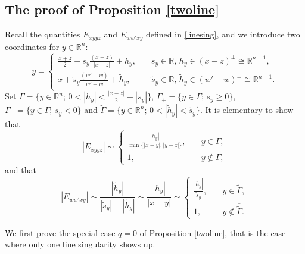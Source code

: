 \documentclass[11pt,reqno]{amsart}
\numberwithin{equation}{section}
\theoremstyle{definition}
\begin{document}
\begin{appendix}
	\renewcommand{\appendixname}{Appendix\,\,}
	\section{The proof of Proposition \ref{twoline}}\label{app-001}
	
	Recall the quantities $E_{xyyz}$ and $E_{ww'xy}$ defined in \eqref{linesing}, and we introduce two coordinates for $y\in\mathbb{R}^n$:
	\begin{equation}\label{l1}
		y=\begin{cases}
			\mbox{$\frac{x+z}{2}+s_y\frac{(x-z)}{|x-z|}+h_y$},\quad &s_y\in\mathbb{R},\,h_y\in(x-z)^\perp\cong\mathbb{R}^{n-1},\\
			\mbox{$x+\tilde{s}_y\frac{(w'-w)}{|w'-w|}+\tilde{h}_y$},&\tilde{s}_y\in\mathbb{R},\,\tilde{h}_y\in(w'-w)^\perp\cong\mathbb{R}^{n-1}.
		\end{cases}
	\end{equation}
	Set $\Gamma=\{y\in\mathbb{R}^n;\,0<|h_y|<\mbox{$\frac{|x-z|}{2}-|s_y|$}\}$, $\Gamma_+=\{y\in\Gamma;\,s_y\geq0\}$, $\Gamma_-=\{y\in\Gamma;\,s_y<0\}$ and $\tilde{\Gamma}=\{y\in\mathbb{R}^n;\,0<|\tilde{h}_y|<\tilde{s}_y\}$. It is elementary to show that
	\begin{equation}\label{l3}
		|E_{xyyz}|\sim
		\begin{cases}
			\frac{|h_y|}{\min\{|x-y|,|y-z|\}},\quad &y\in\Gamma,\\
			1,&y\notin\overline{\Gamma},
		\end{cases}
	\end{equation}
	and that
	\begin{equation}\label{l4}
		|E_{ww'xy}|\sim\mbox{$\frac{|\tilde{h}_y|}{|\tilde{s}_y|+|\tilde{h}_y|}$}\sim\mbox{$\frac{|\tilde{h}_y|}{|x-y|}$}\sim
		\begin{cases}
			\mbox{$\frac{|\tilde{h}_y|}{\tilde{s}_y}$},\quad&y\in\tilde{\Gamma},\\
			1,&y\notin\overline{\tilde{\Gamma}}.
		\end{cases}
	\end{equation}
	
	We first prove the special case $q=0$ of Proposition \ref{twoline}, that is the case where only one line singularity shows up.
	

\end{appendix}
\end{document}
